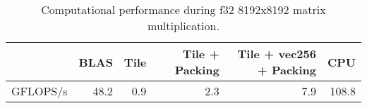 \begin{table}
\centering
\caption{Computational performance during f32 8192x8192 matrix multiplication.}
\begin{tabular}{lrrrrr}
\toprule
{} &  BLAS &  Tile &  Tile + Packing &  Tile + vec256 + Packing &   CPU \\
\midrule
GFLOPS/s &  48.2 &   0.9 &             2.3 &                      7.9 & 108.8 \\
\bottomrule
\end{tabular}
\end{table}
